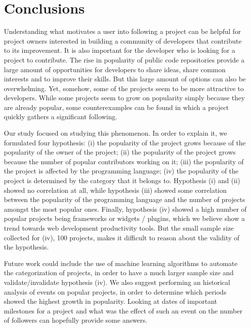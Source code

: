 
\section{Conclusions}
\label{sec:conclusions}

Understanding what motivates a user into following a project can be helpful for project owners interested in building a community of developers that contribute to its improvement. It is also important for the developer who is looking for a project to contribute. The rise in popularity of public code repositories provide a large amount of opportunities for developers to share ideas, share common interests and to improve their skills. But this large amount of options can also be overwhelming. Yet, somehow, some of the projects seem to be more attractive to developers. While some projects seem to grow on popularity simply because they are already popular, some counterexamples can be found in which a project quickly gathers a significant following.

Our study focused on studying this phenomenon. In order to explain it, we formulated four hypothesis: (i) the popularity of the project grows because of the popularity of the owner of the project; (ii) the popularity of the project grows because the number of popular contributors working on it; (iii) the popularity of the project is affected by the programming language; (iv) the popularity of the project is determined by the category that it belongs to. Hypothesis (i) and (ii) showed no correlation at all, while hypothesis (iii) showed some correlation between the popularity of the programming language and the number of projects amongst the most popular ones. Finally, hypothesis (iv) showed a high number of popular projects being frameworks or widgets / plugins, which we believe show a trend towards web development productivity tools.  But the small sample size collected for (iv), 100 projects, makes it difficult to reason about the validity of the hypothesis.

Future work could include the use of machine learning algorithms to automate the categorization of projects, in order to have a much larger sample size and validate/invalidate hypothesis (iv). We also suggest performing an historical analysis of events on popular projects, in order to determine which periods showed the highest growth in popularity. Looking at dates of important milestones for a project and what was the effect of such an event on the number of followers can hopefully provide some answers.
